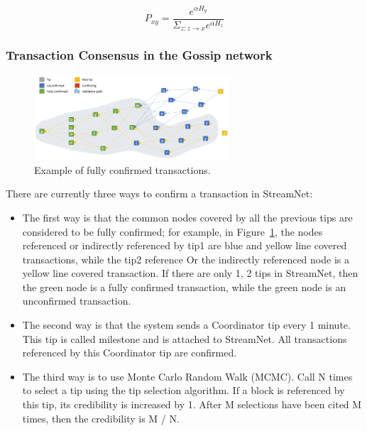 \begin{equation}
\label{simple_equation}
P_{xy} = \frac{e^{\alpha H_{y}}}{\Sigma_{z:z \rightarrow x}e^{\alpha H_{z}}}
\end{equation}

\subsubsection{Transaction Consensus in the Gossip network}

\begin{figure}[ht]
\begin{center}
\includegraphics[width=0.65\textwidth]{figures/full_confirmation.png}
    \caption{
        Example of fully confirmed transactions.
     }
\label{full_confirmation}
\end{center}
\end{figure}

There are currently three ways to confirm a transaction in StreamNet:
\begin{itemize}
\item The first way is that the common nodes covered by all the previous tips are considered to be fully confirmed; for example, in Figure~\ref{full_confirmation}, 
    the nodes referenced or indirectly referenced by tip1 are blue and yellow line covered transactions, 
    while the tip2 reference Or the indirectly referenced node is a yellow line covered transaction.
    If there are only 1, 2 tips in StreamNet, then the green node is a fully confirmed transaction, while the green node is an unconfirmed transaction.
\item The second way is that the system sends a Coordinator tip every 1 minute.
    This tip is called milestone and is attached to StreamNet.
    All transactions referenced by this Coordinator tip are confirmed.
\item The third way is to use Monte Carlo Random Walk (MCMC). 
    Call N times to select a tip using the tip selection algorithm.
    If a block is referenced by this tip, its credibility is increased by 1.
    After M selections have been cited M times, then the credibility is M / N.
\end{itemize}


